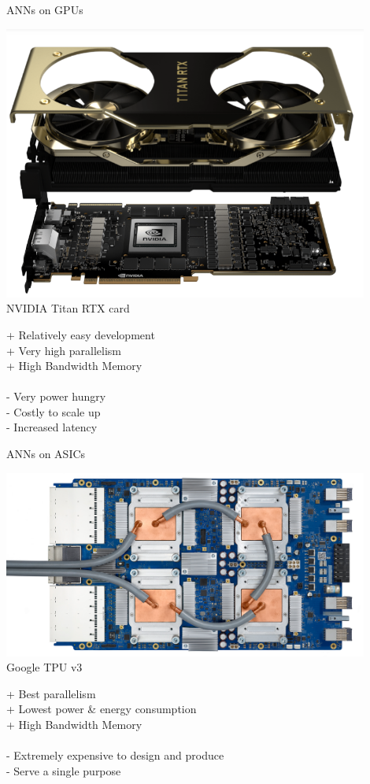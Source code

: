 \begin{frame}{ANNs on GPUs}
	\begin{minipage}{0.4\textwidth}
		\centering
		\includegraphics[width=0.9\textwidth]{../Images/Hardware/NVIDIA-Titan-RTX.png}\\
		NVIDIA Titan RTX card
	\end{minipage}%
	\begin{minipage}{0.6\textwidth}
		+ Relatively easy development\\
		+ Very high parallelism\\
		+ High Bandwidth Memory\\\\
		- Very power hungry\\
		- Costly to scale up\\
		- Increased latency
	\end{minipage}
\end{frame}

\begin{frame}{ANNs on ASICs}
	\begin{minipage}{0.4\textwidth}
		\centering
		\includegraphics[width=0.9\textwidth]{../Images/Hardware/tpu-v3.png}\\
		Google TPU v3
	\end{minipage}%
	\begin{minipage}{0.6\textwidth}
		+ Best parallelism\\
		+ Lowest power \& energy consumption\\
		+ High Bandwidth Memory\\\\
		- Extremely expensive to design and produce\\
		- Serve a single purpose
	\end{minipage}
\end{frame}


